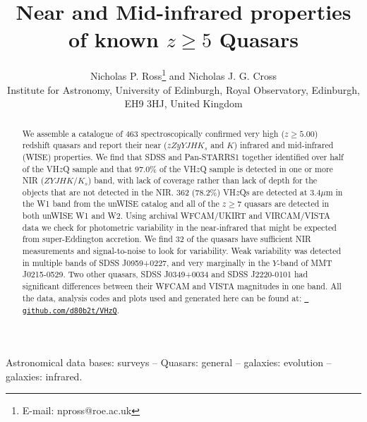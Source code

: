 \documentclass[usenatbib]{mnras}
\begin{document}
\title[Infrared properties Very high-$z$ Quasars]
  {Near and Mid-infrared properties of known $z\geq5$ Quasars}
\author[Ross \& Cross]
{Nicholas P. Ross\thanks{E-mail: npross@roe.ac.uk} and Nicholas J. G. Cross \\ 
Institute for Astronomy, University of Edinburgh, Royal Observatory, Edinburgh, EH9 3HJ, United Kingdom\\ }

\maketitle
\begin{abstract}
We assemble a catalogue of 463 spectroscopically confirmed very high ($z\geq5.00$) redshift quasars and report their near ($zZyYJHK_{s}$ and $K$) infrared and mid-infrared (WISE) properties. We find that SDSS and Pan-STARRS1 together identified over half of the VH$z$Q sample and that 97.0\% of the VH$z$Q sample is detected in one or more NIR ($ZYJHK/K_{s}$) band, with lack of coverage rather than lack of depth for the objects that are not detected in the NIR. 362 (78.2\%) VH$z$Qs are detected at 3.4$\mu$m in the W1 band from the unWISE catalog and all of the $z\geq7$ quasars are detected in both unWISE W1 and W2. Using archival WFCAM/UKIRT and VIRCAM/VISTA data we check for photometric variability in the near-infrared that might be expected from super-Eddington accretion. We find 32 of the quasars have sufficient NIR measurements and signal-to-noise to look for variability. Weak variability was detected in multiple bands of SDSS J0959+0227, and very marginally in the $Y$-band of MMT J0215-0529. Two other quasars, SDSS J0349+0034 and SDSS J2220-0101 had significant differences between their WFCAM and VISTA magnitudes in one band. 
All the data, analysis codes and plots used and generated here can be
found at: \href{https://github.com/d80b2t/VHzQ}{\tt
github.com/d80b2t/VHzQ}.
\end{abstract}


\begin{keywords}
Astronomical data bases: surveys -- 
Quasars: general -- 
galaxies: evolution -- 
galaxies: infrared.
\end{keywords}
\end{document}
